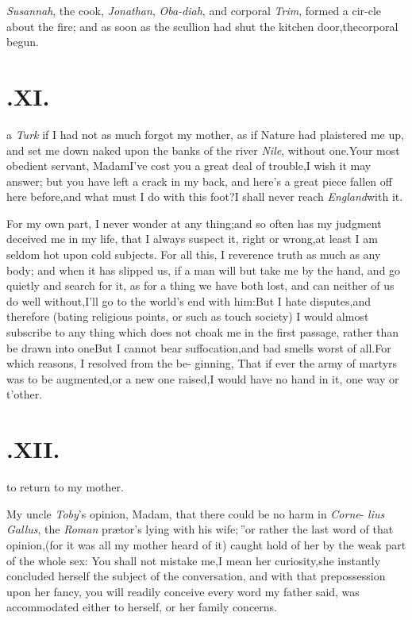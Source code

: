 \documentclass{article}
\begin{document}
\setlength{\baselineskip}{14pt} 
\textit{Susannah}, the cook, \textit{Jonathan},
\textit{Oba-\break diah}, and
corporal \textit{Trim}, formed a cir-\break cle about the fire; and as soon
as the scullion had shut the kitchen door,\tsk the\break corporal
begun.

\section{.\enspace  XI.}

 a \textit{Turk} if I had not as
much forgot my mother, as if Nature had\break 
plaistered me up, and set me down\break
naked upon the banks of the river \textit{Nile},\break
without one.\tsh Your most obedient servant,
Madam\tsk I’ve cost you a great deal of trouble,\tsk I
wish it may answer;\break
\tsk but you have left a crack in my back,\break
\tsk and here’s a great piece fallen off here
before,\tsk and what must I do with this foot?\tsh I
shall never reach \textit{England}\break with it.

For my own part, I never wonder at any thing;\tsk and so often
has my judgment deceived me in my life, that I always suspect it,
right or wrong,\tsk at least I am seldom hot upon cold subjects.
For all this, I reverence truth as much as any body; and when it
has slipped us, if a man will but take me by the hand, and go
quietly and search for it, as for a thing we have both lost, and
can neither of us do well without,\tsk I’ll go to the world’s end with
him:\tsh But I hate disputes,\tsk and therefore (bating
religious points, or such as touch society) I would almost
subscribe to any thing which does not choak me in the first
passage, rather than be drawn into one\break\tsh But I cannot
bear suffocation,\tsh and bad smells worst of
all.\tsh For which reasons, I resolved from the be- ginning,
That if ever the army of martyrs was to be augmented,\tsk or a
new one raised,\tsk I would have no hand in it, one way or
t’other.

\section{.\enspace  XII.}

 to return to my mother.

My uncle \textit{Toby}’s opinion, Madam,\break 
\lqq that there could be no harm in \textit{Corne}-
\lqq \textit{lius Gallus}, the \textit{Roman} prætor’s lying\break
\lqq with his wife;\,”\tsh or rather the last word of that opinion,\tsk (for it was
all my mother heard of it) caught hold of her by the weak part of the whole
sex:\break
\tsk You shall not mistake me,\tsk I mean her curiosity,\tsk she instantly concluded
herself the subject of the conversation, and with that prepossession upon her fancy,
you will readily conceive every
word my father said, was accommodated either to
herself, or her family concerns.
\end{document}
